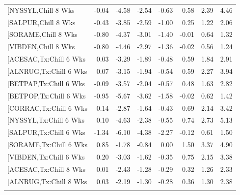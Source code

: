 \documentclass{article}\usepackage[]{graphicx}\usepackage[]{color}
\begin{document}
\begin{longtable}{lrrrrrrr}
  [NYSSYL,Chill 8 Wks & -0.04 & -4.58 & -2.54 & -0.63 & 0.58 & 2.39 & 4.46 \\ 
  [SALPUR,Chill 8 Wks & -0.43 & -3.85 & -2.59 & -1.00 & 0.25 & 1.22 & 2.06 \\ 
  [SORAME,Chill 8 Wks & -0.80 & -4.37 & -3.01 & -1.40 & -0.01 & 0.64 & 1.32 \\ 
  [VIBDEN,Chill 8 Wks & -0.80 & -4.46 & -2.97 & -1.36 & -0.02 & 0.56 & 1.24 \\ 
  [ACESAC,Tx:Chill 6 Wks & 0.03 & -3.29 & -1.89 & -0.48 & 0.59 & 1.84 & 2.91 \\ 
  [ALNRUG,Tx:Chill 6 Wks & 0.07 & -3.15 & -1.94 & -0.54 & 0.59 & 2.27 & 3.94 \\ 
  [BETPAP,Tx:Chill 6 Wks & -0.09 & -3.57 & -2.04 & -0.57 & 0.48 & 1.63 & 2.82 \\ 
  [BETPOP,Tx:Chill 6 Wks & -0.95 & -5.67 & -3.62 & -1.58 & -0.02 & 0.62 & 1.42 \\ 
  [CORRAC,Tx:Chill 6 Wks & 0.14 & -2.87 & -1.64 & -0.43 & 0.69 & 2.14 & 3.42 \\ 
  [NYSSYL,Tx:Chill 6 Wks & 0.10 & -4.63 & -2.38 & -0.55 & 0.74 & 2.73 & 5.13 \\ 
  [SALPUR,Tx:Chill 6 Wks & -1.34 & -6.10 & -4.38 & -2.27 & -0.12 & 0.61 & 1.50 \\ 
  [SORAME,Tx:Chill 6 Wks & 0.85 & -1.78 & -0.84 & 0.00 & 1.50 & 3.37 & 4.90 \\ 
  [VIBDEN,Tx:Chill 6 Wks & 0.20 & -3.03 & -1.62 & -0.35 & 0.75 & 2.15 & 3.38 \\ 
  [ACESAC,Tx:Chill 8 Wks & 0.01 & -2.43 & -1.28 & -0.29 & 0.32 & 1.26 & 2.33 \\ 
  [ALNRUG,Tx:Chill 8 Wks & 0.03 & -2.19 & -1.30 & -0.28 & 0.36 & 1.30 & 2.38 \\ 
   \hline
\hline
\label{tab:suppmodchl}
\end{longtable}
\end{document}
